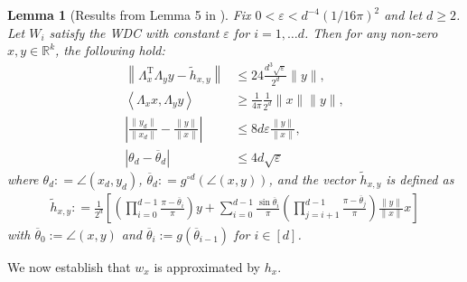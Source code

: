\documentclass[11pt]{article}
\renewcommand{\epsilon}{\varepsilon}
\newcommand{\R}{\mathbb{R}}
\renewcommand{\top}{{\mathrm{T}}}
\newtheorem{lem}{Lemma}
\theoremstyle{remark}
\begin{document}
\begin{lem}[Results from Lemma 5 in \cite{HV2017}] \label{boundsforvtoh}
Fix $0 < \epsilon < d^{-4}(1/16\pi)^2$ and let $d \geqslant 2$. Let $W_i$ satisfy the WDC with constant $\epsilon$ for $i = 1,\dots d$. Then for any non-zero $x,y \in \R^k$, the following hold: \begin{align}
\left\|\Lambda_x^\top\Lambda_yy - \tilde{h}_{x,y}\right\| & \leqslant 24 \frac{d^3\sqrt{\epsilon}}{2^d}\|y\|, \label{conc_htilde}\\
\left\langle \Lambda_x x, \Lambda_y y \right\rangle & \geqslant \frac{1}{4\pi}\frac{1}{2^d}\|x\|\|y\|, \label{conc_inn_prod}\\
\left| \frac{\|y_d\|}{\|x_d\|} - \frac{\|y\|}{\|x\|} \right| & \leqslant 8d\epsilon \frac{\|y\|}{\|x\|}, \label{conc_norm}\\
|\theta_d - \overline{\theta}_d| & \leqslant 4d\sqrt{\epsilon} \label{conc_angle}
\end{align} where  $\theta_d : = \angle(x_d,y_d)$, $\overline{\theta}_d : = g^{\circ d}(\angle(x,y))$, and the vector $\tilde{h}_{x,y}$ is defined as \begin{align}
\tilde{h}_{x,y} : = \frac{1}{2^d}\left[ \left(\prod_{i=0}^{d-1} \frac{\pi - \overline{\theta}_i}{\pi}\right)y + \sum_{i=0}^{d-1}\frac{\sin\overline{\theta}_i}{\pi} \left(\prod_{j=i+1}^{d-1} \frac{\pi - \overline{\theta}_j}{\pi}\right)\frac{\|y\|}{\|x\|}x\right] \label{htilde_def}
\end{align} with $\overline{\theta}_0 := \angle(x,y)$ and $\overline{\theta}_i := g(\overline{\theta}_{i-1})$ for $i \in [d]$.
\end{lem}

We now establish that $w_x$ is approximated by $h_x$.
\end{document}
